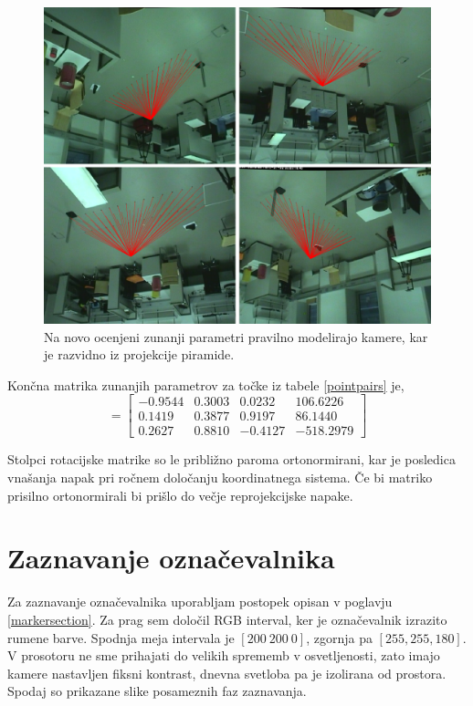 \documentclass[a4paper, 12pt]{book}
\begin{document}
\begin{figure}[H]
\centering
\includegraphics[scale=0.25]{reprojection_corrected.png}
\caption{Na novo ocenjeni zunanji parametri pravilno modelirajo kamere, kar je razvidno iz projekcije piramide.}
\end{figure}

Končna matrika zunanjih parametrov za točke iz tabele \ref{pointpairs} je,
\begin{equation}
[R|\vec{T}] = 
\begin{bmatrix}
-0.9544 & 0.3003 & 0.0232 & 106.6226 \\
0.1419 & 0.3877 & 0.9197 & 86.1440 \\
0.2627 & 0.8810 & -0.4127 & -518.2979 
\end{bmatrix}
\end{equation}

Stolpci rotacijske matrike so le približno paroma ortonormirani, kar je posledica vnašanja napak pri ročnem določanju koordinatnega sistema. Če bi matriko prisilno ortonormirali bi prišlo do večje reprojekcijske napake. 

\section{Zaznavanje označevalnika}
Za zaznavanje označevalnika uporabljam postopek opisan v poglavju \ref{markersection}. Za prag sem določil RGB interval, ker je označevalnik izrazito rumene barve. Spodnja meja intervala je $[200 \ 200 \ 0]$, zgornja pa $[255, 255, 180]$. V prosotoru ne sme prihajati do velikih sprememb v osvetljenosti, zato imajo kamere nastavljen fiksni kontrast, dnevna svetloba pa je izolirana od prostora. Spodaj so prikazane slike posameznih faz zaznavanja.
\end{document}
